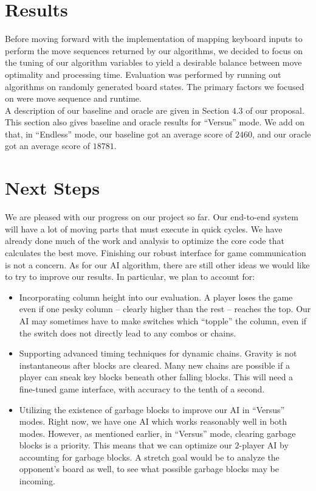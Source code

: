 \documentclass[10pt, final]{article}
\newcommand{\br}[1][.75]{\ \\[#1\baselineskip]}
\begin{document}
\section{Results}
Before moving forward with the implementation of mapping keyboard inputs to perform the move sequences returned by our algorithms, we decided to focus on the tuning of our algorithm variables to yield a desirable balance between move optimality and processing time. Evaluation was performed by running out algorithms on randomly generated board states. The primary factors we focused on were move sequence and runtime.\br
A description of our baseline and oracle are given in Section $4.3$ of our proposal. This section also gives baseline and oracle results for ``Versus'' mode. We add on that, in ``Endless'' mode, our baseline got an average score of $2460$, and our oracle got an average score of $18781$.

\section{Next Steps}
We are pleased with our progress on our project so far. Our end-to-end system will have a lot of moving parts that must execute in quick cycles. We have already done much of the work and analysis to optimize the core code that calculates the best move. Finishing our robust interface for game communication is not a concern. As for our AI algorithm, there are still other ideas we would like to try to improve our results. In particular, we plan to account for:
\begin{itemize}
\item Incorporating column height into our evaluation. A player loses the game even if one pesky column -- clearly higher than the rest -- reaches the top. Our AI may sometimes have to make switches which ``topple'' the column, even if the switch does not directly lead to any combos or chains.
\item Supporting advanced timing techniques for dynamic chains. Gravity is not instantaneous after blocks are cleared. Many new chains are possible if a player can sneak key blocks beneath other falling blocks. This will need a fine-tuned game interface, with accuracy to the tenth of a second.
\item Utilizing the existence of garbage blocks to improve our AI in ``Versus'' modes. Right now, we have one AI which works reasonably well in both modes. However, as mentioned earlier, in ``Versus'' mode, clearing garbage blocks is a priority. This means that we can optimize our $2$-player AI by accounting for garbage blocks. A stretch goal would be to analyze the opponent's board as well, to see what possible garbage blocks may be incoming.
\end{itemize}
\end{document}
